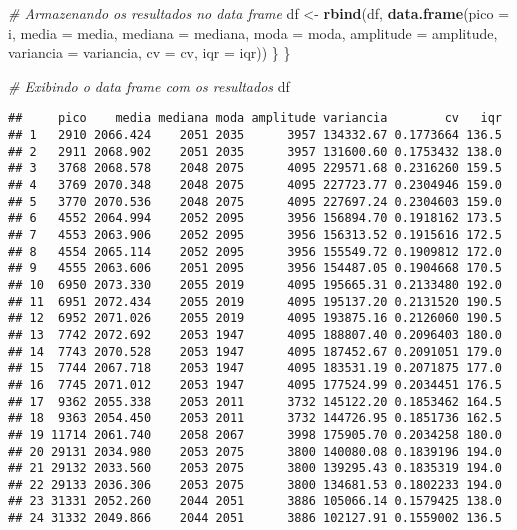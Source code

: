 \documentclass[
]{article}
\newenvironment{Shaded}{\begin{snugshade}}{\end{snugshade}}
\newcommand{\AttributeTok}[1]{\textcolor[rgb]{0.13,0.29,0.53}{#1}}
\newcommand{\CommentTok}[1]{\textcolor[rgb]{0.56,0.35,0.01}{\textit{#1}}}
\newcommand{\FunctionTok}[1]{\textcolor[rgb]{0.13,0.29,0.53}{\textbf{#1}}}
\newcommand{\NormalTok}[1]{#1}
\newcommand{\OtherTok}[1]{\textcolor[rgb]{0.56,0.35,0.01}{#1}}
\begin{document}
\begin{Shaded}
\begin{Highlighting}[]
    \CommentTok{\# Armazenando os resultados no data frame}
\NormalTok{    df }\OtherTok{\textless{}{-}} \FunctionTok{rbind}\NormalTok{(df, }\FunctionTok{data.frame}\NormalTok{(}\AttributeTok{pico =}\NormalTok{ i, }\AttributeTok{media =}\NormalTok{ media, }\AttributeTok{mediana =}\NormalTok{ mediana, }\AttributeTok{moda =}\NormalTok{ moda,}
                               \AttributeTok{amplitude =}\NormalTok{ amplitude, }\AttributeTok{variancia =}\NormalTok{ variancia, }\AttributeTok{cv =}\NormalTok{ cv, }\AttributeTok{iqr =}\NormalTok{ iqr))}
\NormalTok{  \}}
\NormalTok{\}}

\CommentTok{\# Exibindo o data frame com os resultados}
\NormalTok{df}
\end{Highlighting}
\end{Shaded}

\begin{verbatim}
##     pico    media mediana moda amplitude variancia        cv   iqr
## 1   2910 2066.424    2051 2035      3957 134332.67 0.1773664 136.5
## 2   2911 2068.902    2051 2035      3957 131600.60 0.1753432 138.0
## 3   3768 2068.578    2048 2075      4095 229571.68 0.2316260 159.5
## 4   3769 2070.348    2048 2075      4095 227723.77 0.2304946 159.0
## 5   3770 2070.536    2048 2075      4095 227697.24 0.2304603 159.0
## 6   4552 2064.994    2052 2095      3956 156894.70 0.1918162 173.5
## 7   4553 2063.906    2052 2095      3956 156313.52 0.1915616 172.5
## 8   4554 2065.114    2052 2095      3956 155549.72 0.1909812 172.0
## 9   4555 2063.606    2051 2095      3956 154487.05 0.1904668 170.5
## 10  6950 2073.330    2055 2019      4095 195665.31 0.2133480 192.0
## 11  6951 2072.434    2055 2019      4095 195137.20 0.2131520 190.5
## 12  6952 2071.026    2055 2019      4095 193875.16 0.2126060 190.5
## 13  7742 2072.692    2053 1947      4095 188807.40 0.2096403 180.0
## 14  7743 2070.528    2053 1947      4095 187452.67 0.2091051 179.0
## 15  7744 2067.718    2053 1947      4095 183531.19 0.2071875 177.0
## 16  7745 2071.012    2053 1947      4095 177524.99 0.2034451 176.5
## 17  9362 2055.338    2053 2011      3732 145122.20 0.1853462 164.5
## 18  9363 2054.450    2053 2011      3732 144726.95 0.1851736 162.5
## 19 11714 2061.740    2058 2067      3998 175905.70 0.2034258 180.0
## 20 29131 2034.980    2053 2075      3800 140080.08 0.1839196 194.0
## 21 29132 2033.560    2053 2075      3800 139295.43 0.1835319 194.0
## 22 29133 2036.306    2053 2075      3800 134681.53 0.1802233 194.0
## 23 31331 2052.260    2044 2051      3886 105066.14 0.1579425 138.0
## 24 31332 2049.866    2044 2051      3886 102127.91 0.1559002 136.5

\end{verbatim}
\end{document}
